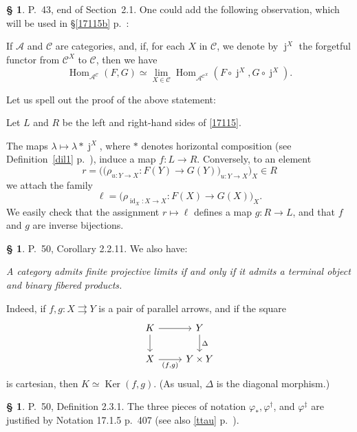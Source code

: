 \documentclass[12pt]{article}%
\theoremstyle{remark}
\theoremstyle{definition}
\newtheorem{s}[thm]{\S}%
\newcommand{\oo}{\operatorname}
\newcommand{\A}{\mathcal A}
\newcommand{\C}{\mathcal C}
\newcommand{\pp}{\varphi}
\newcommand{\parar}{\rightrightarrows}
\DeclareMathOperator{\id}{id}
\DeclareMathOperator{\Hom}{Hom}%
\DeclareMathOperator{\Ker}{Ker}
\begin{document}
%

\begin{s}
P.~43, end of Section~2.1. One could add the following observation, which will be used in \S\ref{17115b} p.~\pageref{17115b}: 

If $\A$ and $\C$ are categories, and, if, for each $X$ in $\C$, we denote by $\oo j^X$ the forgetful functor from $\C^X$ to $\C$, then we have
%
\begin{equation}\label{17115}
\Hom_{\A^\C}(F,G)\simeq\lim_{X\in\C}\Hom_{\A^{\C^X}}(F\circ\oo j^X,G\circ\oo j^X).
\end{equation}

Let us spell out the proof of the above statement: 

Let $L$ and $R$ be the left and right-hand sides of \eqref{17115}. 

The maps $\lambda\mapsto\lambda*\oo j^X$, where $*$ denotes horizontal composition (see Definition~\ref{dil1} p.~\pageref{dil1}), induce a map $f:L\to R$. Conversely, to an element  
$$
r=\Big(\big(\rho_{u:Y\to X}:F(Y)\to G(Y)\big)_{u:Y\to X}\Big)_X\in R
$$ 
we attach the family
$$
\ell=\big(\rho_{\id_X:X\to X}:F(X)\to G(X)\big)_X.
$$ 
We easily check that the assignment $r\mapsto\ell$ defines a map $g:R\to L$, and that $f$ and $g$ are inverse bijections.
\end{s}

%

\begin{s}\label{fpl}
P.~50, Corollary 2.2.11. We also have:

\emph{A category admits finite projective limits if and only if it admits a terminal object and binary fibered products.}

Indeed, if $f,g:X\parar Y$ is a pair of parallel arrows, and if the square 
$$
\begin{tikzcd}
K\ar{d}\ar{r}&Y\ar{d}{\Delta}\\ 
X\ar{r}[swap]{(f,g)}&Y\times Y
\end{tikzcd}
$$
is cartesian, then $K\simeq\Ker(f,g)$. (As usual, $\Delta$ is the diagonal morphism.)
\end{s}

%

\begin{s}
P.~50, Definition 2.3.1. The three pieces of notation $\pp_*,\pp^\dagger$, and $\pp^\ddagger$ are justified by Notation 17.1.5 p.~407 (see also \eqref{ttau} p.~\pageref{ttau}). %
\end{s}
\end{document}
